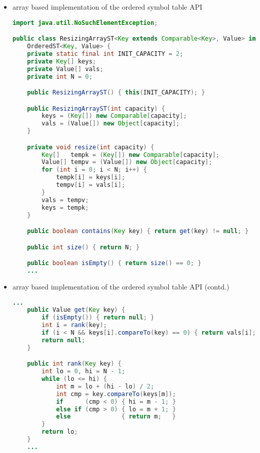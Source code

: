 \documentclass[8pt,a4paper,compress]{beamer}
\begin{document}
\begin{frame}[fragile]
\begin{itemize}
\item array based implementation of the ordered symbol table API

\begin{lstlisting}[language=Java]
import java.util.NoSuchElementException;

public class ResizingArrayST<Key extends Comparable<Key>, Value> implements 
    OrderedST<Key, Value> {
    private static final int INIT_CAPACITY = 2;
    private Key[] keys;
    private Value[] vals;
    private int N = 0;

    public ResizingArrayST() { this(INIT_CAPACITY); }   

    public ResizingArrayST(int capacity) { 
        keys = (Key[]) new Comparable[capacity]; 
        vals = (Value[]) new Object[capacity]; 
    }   

    private void resize(int capacity) {
        Key[]   tempk = (Key[]) new Comparable[capacity];
        Value[] tempv = (Value[]) new Object[capacity];
        for (int i = 0; i < N; i++) {
            tempk[i] = keys[i];
            tempv[i] = vals[i];
        }
        vals = tempv;
        keys = tempk;
    }

    public boolean contains(Key key) { return get(key) != null; }

    public int size() { return N; }

    public boolean isEmpty() { return size() == 0; }
    ...
\end{lstlisting}
\end{itemize}
\end{frame}

\begin{frame}[fragile]
\begin{itemize}
\item array based implementation of the ordered symbol table API (contd.)
\begin{lstlisting}[language=Java]
    ...        
    public Value get(Key key) {
        if (isEmpty()) { return null; }
        int i = rank(key); 
        if (i < N && keys[i].compareTo(key) == 0) { return vals[i]; }
        return null;
    } 

    public int rank(Key key) {
        int lo = 0, hi = N - 1; 
        while (lo <= hi) { 
            int m = lo + (hi - lo) / 2; 
            int cmp = key.compareTo(keys[m]); 
            if      (cmp < 0) { hi = m - 1; }
            else if (cmp > 0) { lo = m + 1; } 
            else              { return m;   }
        } 
        return lo;
    } 
    ...
\end{lstlisting}
\end{itemize}
\end{frame}
\end{document}
